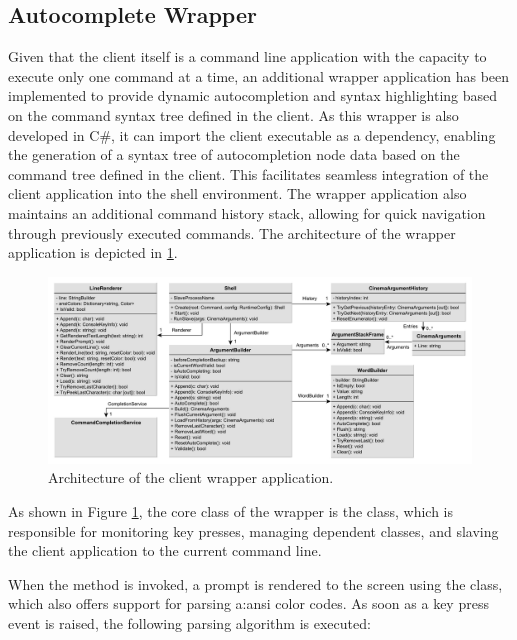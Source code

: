 \subsection{Autocomplete Wrapper}\label{sec:cs-autocomplete}

Given that the client itself is a command line application with the capacity to execute only one command at a time, an additional wrapper application has been implemented to provide dynamic autocompletion and syntax highlighting based on the command syntax tree defined in the client. As this wrapper is also developed in C\#, it can import the client executable as a dependency, enabling the generation of a syntax tree of autocompletion node data based on the command tree defined in the client. This facilitates seamless integration of the client application into the shell environment. The wrapper application also maintains an additional command history stack, allowing for quick navigation through previously executed commands. The architecture of the wrapper application is depicted in \cref{fig:client-wrapper}.

\begin{figure}[H]
    \centering
    \includegraphics[width=\textwidth]{images/client-wrapper}
    \caption{Architecture of the client wrapper application.}
    \label{fig:client-wrapper}
\end{figure}

As shown in Figure \ref{fig:client-wrapper}, the core class of the wrapper is the  class, which is responsible for monitoring key presses, managing dependent classes, and slaving the client application to the current command line.

When the  method is invoked, a prompt is rendered to the screen using the  class, which also offers support for parsing \gls{a:ansi} color codes. As soon as a key press event is raised, the following parsing algorithm is executed:


